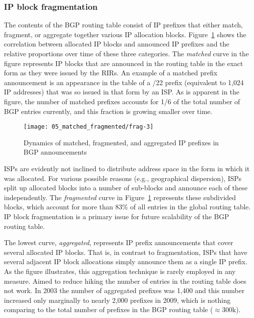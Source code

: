 \subsubsection{IP block fragmentation}

The contents of the BGP routing table consist of IP prefixes that either
match, fragment, or aggregate together various IP allocation blocks.
Figure~\ref{fig:fragmentation} shows the correlation between allocated IP
blocks and announced IP prefixes and the relative proportions over time of
these three categories. The \emph{matched} curve in the figure represents IP
blocks that are announced in the routing table in the exact form as they were
issued by the RIRs. An example of a matched prefix announcement is an
appearance in the table of a /22 prefix (equivalent to 1,024 IP addresses)
that was so issued in that form by an ISP. As is apparent in the figure, the
number of matched prefixes accounts for 1/6 of the total number of BGP entries
currently, and this fraction is growing smaller over time.

\begin{figure}[htbp]
	\centering
		\texttt{[image: 05\_matched\_fragmented/frag-3]}
	\caption{Dynamics of matched, fragmented, and aggregated IP prefixes in BGP announcements}
	\label{fig:fragmentation}
\end{figure}

ISPs are evidently not inclined to distribute address space in the form in
which it was allocated. For various possible reasons (e.g., geographical
dispersion), ISPs split up allocated blocks into a number of sub-blocks and
announce each of these independently. The \emph{fragmented} curve in
Figure~\ref{fig:fragmentation} represents these subdivided blocks, which
account for more than 83\% of all entries in the global routing table. IP
block fragmentation is a primary issue for future scalability of the BGP
routing table.

The lowest curve, \emph{aggregated}, represents IP prefix announcements that
cover several allocated IP blocks. That is, in contrast to fragmentation, ISPs
that have several adjacent IP block allocations simply announce them as a
single IP prefix. As the figure illustrates, this aggregation technique is
rarely employed in any measure. Aimed to reduce hiking the number of entries
in the routing table does not work. In 2003 the number of aggregated prefixes
was 1,400 and this number increased only marginally to nearly 2,000 prefixes
in 2009, which is nothing comparing to the total number of prefixes in the BGP
routing table ($\approx$300k).

